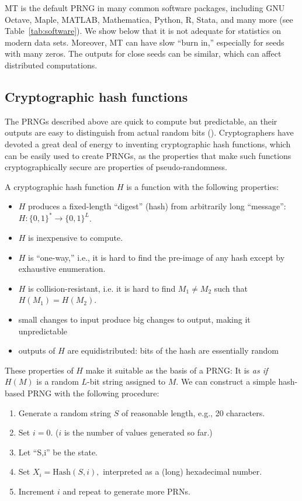 \documentclass[graybox]{svmult}
\newcommand{\todo}[1]{{\color{red}{TO DO: \sc #1}}}
\begin{document}
MT is the default PRNG in many common software packages, including GNU Octave, Maple, MATLAB, Mathematica, Python, R, Stata, and many more (see Table~\ref{tab:software}).
We show below that it is not adequate for statistics on modern data sets.
Moreover, MT can have slow ``burn in,'' especially for seeds with many zeros. \todo{CITE: MT website}
The outputs for close seeds can be similar, which can affect distributed computations.

\subsection{Cryptographic hash functions}
The PRNGs described above are quick to compute but predictable,
an their outputs are easy to distinguish from actual random bits (\cite{lecuyer_testu01_2007}).
Cryptographers have devoted a great deal of energy to inventing cryptographic 
hash functions, which can be easily used to create PRNGs, as the properties that make such functions cryptographically secure
are properties of pseudo-randomness.

A cryptographic hash function $H$ is a function with the following properties:

\begin{itemize}
\item $H$ produces a fixed-length ``digest'' (hash) from arbitrarily long ``message'': $H:\{0, 1\}^* \rightarrow \{0, 1\}^L$.
\item $H$ is inexpensive to compute.
\item $H$ is ``one-way,'' i.e., it is hard to find the pre-image of any hash except by exhaustive enumeration.
\item $H$ is collision-resistant, i.e. it is hard to find $M_1 \ne M_2$ such that $H(M_1) = H(M_2)$.
\item small changes to input produce big changes to output, making it unpredictable
\item outputs of $H$ are equidistributed: bits of the hash are essentially random 
\end{itemize}

These properties of $H$ make it suitable as the basis of a PRNG:
It is \emph{as if} $H(M)$ is a random $L$-bit string assigned to $M$.
We can construct a simple hash-based PRNG with the following procedure:

\begin{enumerate}
\item Generate a random string $S$ of reasonable length, e.g., 20 characters.
\item Set $i=0$. ($i$ is the number of values generated so far.)
\item Let ``S,i'' be the state.
\item Set $X_i = {\mbox{Hash}}(S,i),$ interpreted as a (long) hexadecimal number.
\item Increment $i$ and repeat to generate more PRNs.
\end{enumerate}
\end{document}
